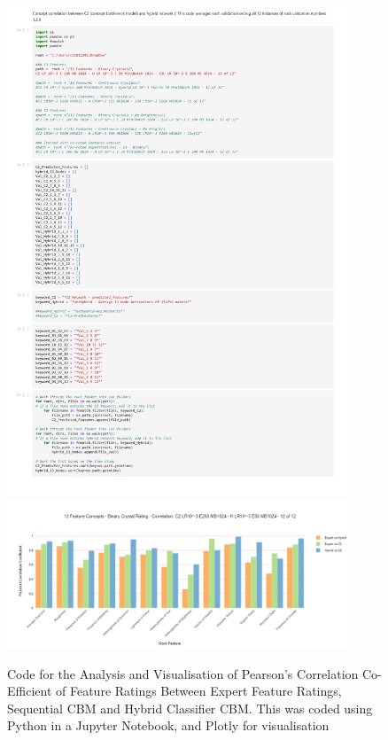 \begin{figure}[H]
  \centering
    \includegraphics[page=7, width=0.92\textwidth, trim= 20 500 20 0, clip]{Code/Correlation_Visualisation_and_CSV_for_Average_Feature_Ratings_-_12_of_12.pdf}
    \includegraphics[width=0.92\textwidth, trim = 1cm 0.2cm 0.5cm 0, clip]{images/13 Feature Concepts - Binary Crystal Rating - Correlation- C2 LR10^-3 E200 MB1024 - H LR10^-3 E50 MB1024 - 12 of 12.png}
    \caption{Code for the Analysis and Visualisation of Pearson's Correlation Co-Efficient of Feature Ratings Between Expert Feature Ratings, Sequential CBM and Hybrid Classifier CBM. This was coded using Python in a Jupyter Notebook, and Plotly for visualisation} \label{fig:Code for the Analysis and Visualisation of Pearson's Correlation Co-Efficient of Feature Ratings Between Expert Feature Ratings, Sequential CBM and Hybrid Classifier CBM}
\end{figure}

